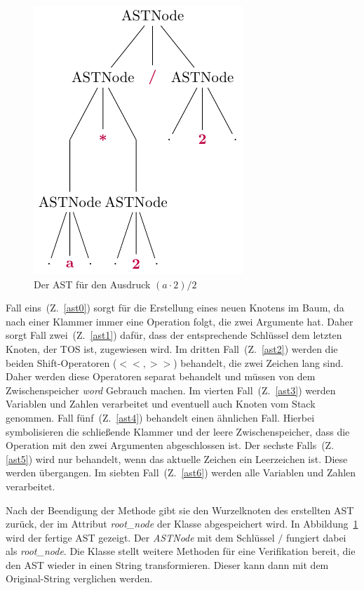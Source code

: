 \begin{figure}
    \begin{center}
      \includegraphics[scale=1.2]{../fig/ast.pdf}
    \end{center}
    \caption{Der AST für den Ausdruck $(a \cdot 2) / 2$}
    \label{fig:astexp}
\end{figure}

Fall eins~(Z.~\ref{ast0}) sorgt für die Erstellung eines neuen Knotens im Baum, da nach einer Klammer immer eine Operation folgt, die zwei Argumente hat.
Daher sorgt Fall zwei~(Z.~\ref{ast1}) dafür, dass der entsprechende Schlüssel dem letzten Knoten, der TOS ist, zugewiesen wird. 
Im dritten Fall~(Z.~\ref{ast2}) werden die beiden Shift-Operatoren ($<<, >>$) behandelt, die zwei Zeichen lang sind. Daher werden diese Operatoren separat behandelt und müssen
von dem Zwischenspeicher \textit{word} Gebrauch machen.
Im vierten Fall~(Z.~\ref{ast3}) werden Variablen und Zahlen verarbeitet und eventuell auch Knoten vom Stack genommen.
Fall fünf~(Z.~\ref{ast4}) behandelt einen ähnlichen Fall. Hierbei symbolisieren die schließende Klammer und der leere Zwischenspeicher, dass die Operation mit den zwei Argumenten abgeschlossen ist. 
Der sechste Falls~(Z. \ref{ast5}) wird nur behandelt, wenn das aktuelle Zeichen ein Leerzeichen ist. Diese werden übergangen.
Im siebten Fall~(Z.~\ref{ast6}) werden alle Variablen und Zahlen verarbeitet.

Nach der Beendigung der Methode gibt sie den Wurzelknoten des erstellten AST zurück, der im Attribut \textit{root\_node} der Klasse abgespeichert wird.
In Abbildung~\ref{fig:astexp} wird der fertige AST gezeigt.
Der \textit{ASTNode} mit dem Schlüssel $/$ fungiert dabei als \textit{root\_node}.
Die Klasse stellt weitere Methoden für eine Verifikation bereit, die den AST wieder in einen String transformieren. Dieser kann dann mit dem Original-String verglichen werden.

